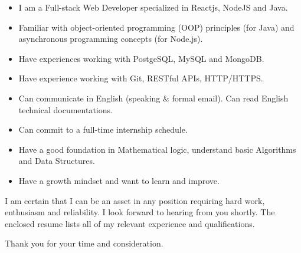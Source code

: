 \documentclass[11pt,a4paper,sans]{moderncv}        %
\begin{document}
\begin{itemize}
  \item I am a Full-stack Web Developer specialized in Reactjs, NodeJS and Java.
  \item Familiar with object-oriented programming (OOP) principles (for Java) and asynchronous programming concepts (for Node.js).
  \item Have experiences working with PostgeSQL, MySQL and MongoDB.
  \item Have experience working with Git, RESTful APIs, HTTP/HTTPS.
  \item Can communicate in English (speaking \& formal email). Can read English technical documentations.
  \item Can commit to a full-time internship schedule.
  \item Have a good foundation in Mathematical logic, understand basic Algorithms and Data Structures.
  \item Have a growth mindset and want to learn and improve.
\end{itemize}

I am certain that I can be an asset in any position requiring hard work, enthusiasm and reliability. I look forward to hearing from you shortly. The enclosed resume lists all of my relevant experience and qualifications.

Thank you for your time and consideration.

\makeletterclosing

\newpage
\end{document}
